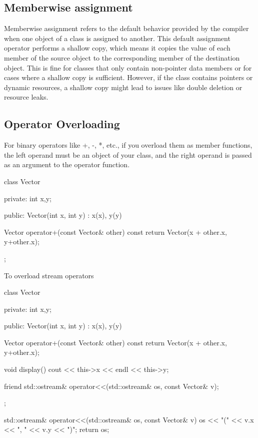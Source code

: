\documentclass{report}
\begin{document}
    \bigbreak \noindent 
    \subsection{Memberwise assignment}
    \bigbreak \noindent 
    \begin{concept}
        Memberwise assignment refers to the default behavior provided by the compiler when one object of a class is assigned to another. This default assignment operator performs a shallow copy, which means it copies the value of each member of the source object to the corresponding member of the destination object. This is fine for classes that only contain non-pointer data members or for cases where a shallow copy is sufficient. However, if the class contains pointers or dynamic resources, a shallow copy might lead to issues like double deletion or resource leaks.
    \end{concept}

    \pagebreak \bigbreak \noindent 
    \subsection{Operator Overloading}
    \bigbreak \noindent 
    For binary operators like +, -, *, etc., if you overload them as member functions, the left operand must be an object of your class, and the right operand is passed as an argument to the operator function.
    \bigbreak \noindent 
    \begin{cppcode}
class Vector {
    private:
        int x,y;

    public:
        Vector(int x, int y) : x(x), y(y) {}

        Vector operator+(const Vector& other) const {
            return Vector(x + other.x, y+other.x);
        }
};
    \end{cppcode}
    \bigbreak \noindent 
    To overload stream operators
    \bigbreak \noindent 
    \begin{cppcode}
class Vector {
    private:
        int x,y;

    public:
        Vector(int x, int y) : x(x), y(y) {}

        Vector operator+(const Vector& other) const {
            return Vector(x + other.x, y+other.x);
        }

        void display() {
            cout << this->x << endl << this->y;
        }

    friend  std::ostream& operator<<(std::ostream& os, const Vector& v);
};

std::ostream& operator<<(std::ostream& os, const Vector& v) {
    os << "(" << v.x << ", " << v.y << ")";
    return os;
}
    \end{cppcode}
    \bigbreak \noindent 
\end{document}
